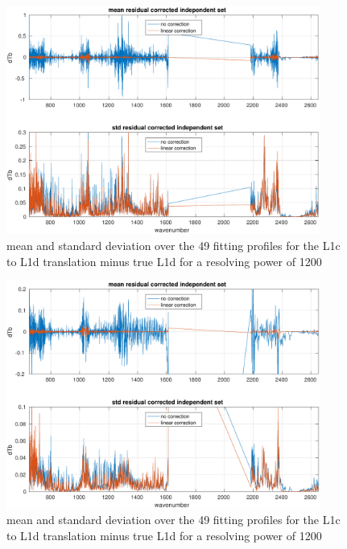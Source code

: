 \documentclass[11pt]{article}
\begin{document}
\begin{figure} %
  \centering
  \includegraphics[height=7.5cm]{figures/L1d_corr_1200.pdf}
  \caption{mean and standard deviation over the 49 fitting profiles
    for the L1c to L1d translation minus true L1d for a resolving
    power of 1200}
  \label{L1d1200}
\end{figure}

\begin{figure} %
  \centering
  \includegraphics[height=7.5cm]{figures/L1d_corr_700.pdf}
  \caption{mean and standard deviation over the 49 fitting profiles
    for the L1c to L1d translation minus true L1d for a resolving
    power of 1200}
  \label{L1d700s}
\end{figure}
\end{document}
